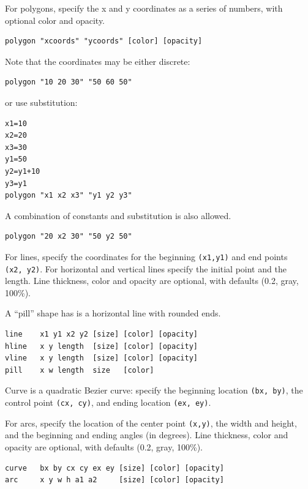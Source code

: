 For polygons, specify the x and y coordinates as a series of numbers,
with optional color and opacity.

\begin{verbatim}
polygon "xcoords" "ycoords" [color] [opacity]
\end{verbatim}

Note that the coordinates may be either discrete:

\begin{verbatim}
polygon "10 20 30" "50 60 50"
\end{verbatim}

or use substitution:

\begin{verbatim}
x1=10
x2=20
x3=30
y1=50
y2=y1+10
y3=y1
polygon "x1 x2 x3" "y1 y2 y3"
\end{verbatim}

A combination of constants and substitution is also allowed.

\begin{verbatim}
polygon "20 x2 30" "50 y2 50"
\end{verbatim}

For lines, specify the coordinates for the beginning \texttt{(x1,y1)}
and end points \texttt{(x2,\ y2)}. For horizontal and vertical lines
specify the initial point and the length. Line thickness, color and
opacity are optional, with defaults (0.2, gray, 100\%).

A ``pill'' shape has is a horizontal line with rounded ends.

\begin{verbatim}
line    x1 y1 x2 y2 [size] [color] [opacity]
hline   x y length  [size] [color] [opacity]
vline   x y length  [size] [color] [opacity]
pill    x w length  size   [color]
\end{verbatim}

Curve is a quadratic Bezier curve: specify the beginning location
\texttt{(bx,\ by)}, the control point \texttt{(cx,\ cy)}, and ending
location \texttt{(ex,\ ey)}.

For arcs, specify the location of the center point \texttt{(x,y)}, the
width and height, and the beginning and ending angles (in degrees). Line
thickness, color and opacity are optional, with defaults (0.2, gray,
100\%).

\begin{verbatim}
curve   bx by cx cy ex ey [size] [color] [opacity]
arc     x y w h a1 a2     [size] [color] [opacity]
\end{verbatim}

